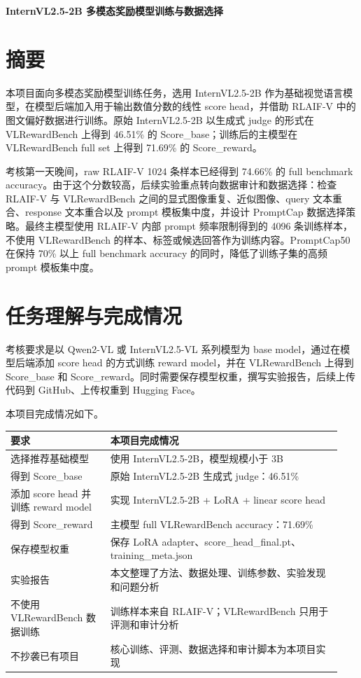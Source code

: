 \documentclass[11pt,a4paper]{ctexart}
\begin{document}
\begin{center}\LARGE\bfseries InternVL2.5-2B 多模态奖励模型训练与数据选择\end{center}

\section*{摘要}

本项目面向多模态奖励模型训练任务，选用 InternVL2.5-2B 作为基础视觉语言模型，在模型后端加入用于输出数值分数的线性 score head，并借助 RLAIF-V 中的图文偏好数据进行训练。原始 InternVL2.5-2B 以生成式 judge 的形式在 VLRewardBench 上得到 46.51\% 的 Score\_base；训练后的主模型在 VLRewardBench full set 上得到 71.69\% 的 Score\_reward。

考核第一天晚间，raw RLAIF-V 1024 条样本已经得到 74.66\% 的 full benchmark accuracy。由于这个分数较高，后续实验重点转向数据审计和数据选择：检查 RLAIF-V 与 VLRewardBench 之间的显式图像重复、近似图像、query 文本重合、response 文本重合以及 prompt 模板集中度，并设计 PromptCap 数据选择策略。最终主模型使用 RLAIF-V 内部 prompt 频率限制得到的 4096 条训练样本，不使用 VLRewardBench 的样本、标签或候选回答作为训练内容。PromptCap50 在保持 70\% 以上 full benchmark accuracy 的同时，降低了训练子集的高频 prompt 模板集中度。

\section{任务理解与完成情况}

考核要求是以 Qwen2-VL 或 InternVL2.5-VL 系列模型为 base model，通过在模型后端添加 score head 的方式训练 reward model，并在 VLRewardBench 上得到 Score\_base 和 Score\_reward。同时需要保存模型权重，撰写实验报告，后续上传代码到 GitHub、上传权重到 Hugging Face。

本项目完成情况如下。

\begin{center}\small
\begin{longtable}{p{0.29\linewidth} p{0.65\linewidth}}
\toprule
要求 & 本项目完成情况 \\
\midrule
选择推荐基础模型 & 使用 InternVL2.5-2B，模型规模小于 3B \\
得到 Score\_base & 原始 InternVL2.5-2B 生成式 judge：46.51\% \\
添加 score head 并训练 reward model & 实现 InternVL2.5-2B + LoRA + linear score head \\
得到 Score\_reward & 主模型 full VLRewardBench accuracy：71.69\% \\
保存模型权重 & 保存 LoRA adapter、score\_head\_final.pt、training\_meta.json \\
实验报告 & 本文整理了方法、数据处理、训练参数、实验发现和问题分析 \\
不使用 VLRewardBench 数据训练 & 训练样本来自 RLAIF-V；VLRewardBench 只用于评测和审计分析 \\
不抄袭已有项目 & 核心训练、评测、数据选择和审计脚本为本项目实现 \\
\bottomrule
\end{longtable}\end{center}
\end{document}
